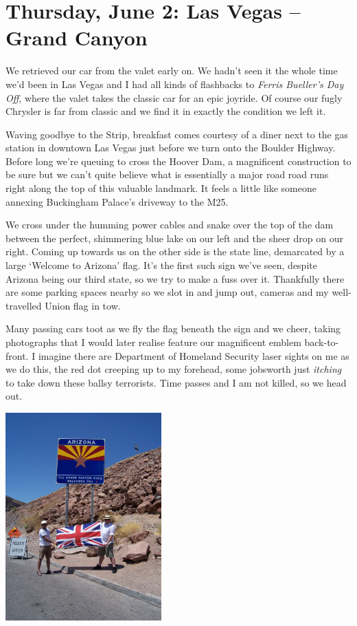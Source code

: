 \documentclass[a5paper,titlepage,11pt]{book}
\begin{document}
\chapter[Las Vegas -- Grand Canyon]{Thursday, June 2: Las Vegas -- Grand Canyon}
We retrieved our car from the valet early on.  We hadn't seen it the whole time we'd been in Las Vegas and I had all kinds of flashbacks to \emph{Ferris Bueller's Day Off}, where the valet takes the classic car for an epic joyride.  Of course our fugly Chrysler is far from classic and we find it in exactly the condition we left it.

Waving goodbye to the Strip, breakfast comes courtesy of a diner next to the gas station in downtown Las Vegas just before we turn onto the Boulder Highway.  Before long we're queuing to cross the Hoover Dam, a magnificent construction to be sure but we can't quite believe what is essentially a major road road runs right along the top of this valuable landmark.  It feels a little like someone annexing Buckingham Palace's driveway to the M25.

We cross under the humming power cables and snake over the top of the dam between the perfect, shimmering blue lake on our left and the sheer drop on our right.  Coming up towards us on the other side is the state line, demarcated by a large `Welcome to Arizona' flag.  It's the first such sign we've seen, despite Arizona being our third state, so we try to make a fuss over it.  Thankfully there are some parking spaces nearby so we slot in and jump out, cameras and my well-travelled Union flag in tow.

Many passing cars toot as we fly the flag beneath the sign and we cheer, taking photographs that I would later realise feature our magnificent emblem back-to-front.  I imagine there are Department of Homeland Security laser sights on me as we do this, the red dot creeping up to my forehead, some jobsworth just \emph{itching} to take down these ballsy terrorists.  Time passes and I am not killed, so we head out.

\begin{center}\includegraphics[height=80mm]{gfx/100_1445}\end{center}
\end{document}
